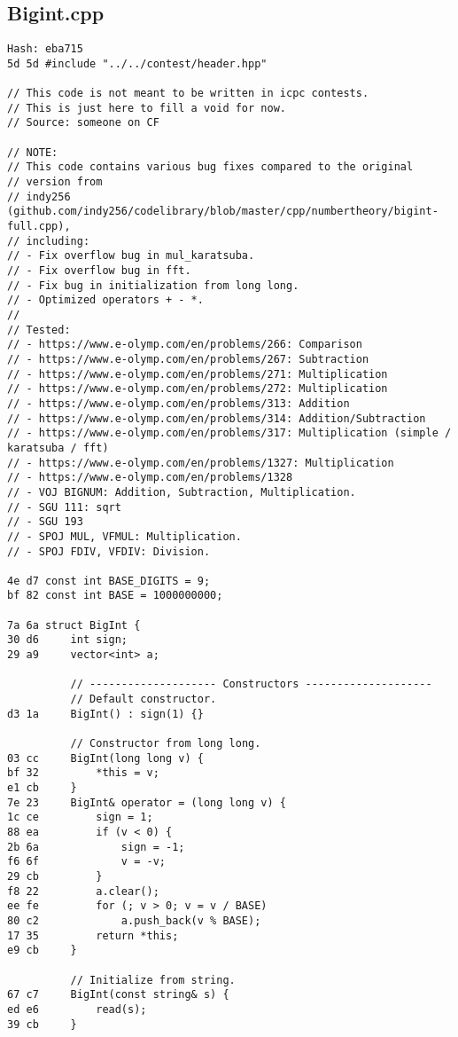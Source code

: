 \documentclass[11pt, a4paper, twoside]{article}
\begin{document}
\subsection{Bigint.cpp}
\begin{lstlisting}
Hash: eba715
5d 5d #include "../../contest/header.hpp"

// This code is not meant to be written in icpc contests. 
// This is just here to fill a void for now. 
// Source: someone on CF

// NOTE:
// This code contains various bug fixes compared to the original 
// version from
// indy256 (github.com/indy256/codelibrary/blob/master/cpp/numbertheory/bigint-full.cpp),
// including:
// - Fix overflow bug in mul_karatsuba.
// - Fix overflow bug in fft.
// - Fix bug in initialization from long long.
// - Optimized operators + - *.
//
// Tested:
// - https://www.e-olymp.com/en/problems/266: Comparison
// - https://www.e-olymp.com/en/problems/267: Subtraction
// - https://www.e-olymp.com/en/problems/271: Multiplication
// - https://www.e-olymp.com/en/problems/272: Multiplication
// - https://www.e-olymp.com/en/problems/313: Addition
// - https://www.e-olymp.com/en/problems/314: Addition/Subtraction
// - https://www.e-olymp.com/en/problems/317: Multiplication (simple / karatsuba / fft)
// - https://www.e-olymp.com/en/problems/1327: Multiplication
// - https://www.e-olymp.com/en/problems/1328
// - VOJ BIGNUM: Addition, Subtraction, Multiplication.
// - SGU 111: sqrt
// - SGU 193
// - SPOJ MUL, VFMUL: Multiplication.
// - SPOJ FDIV, VFDIV: Division.

4e d7 const int BASE_DIGITS = 9;
bf 82 const int BASE = 1000000000;

7a 6a struct BigInt {
30 d6     int sign;
29 a9     vector<int> a;
      
          // -------------------- Constructors -------------------- 
          // Default constructor.
d3 1a     BigInt() : sign(1) {}
      
          // Constructor from long long.
03 cc     BigInt(long long v) {
bf 32         *this = v;
e1 cb     }
7e 23     BigInt& operator = (long long v) {
1c ce         sign = 1;
88 ea         if (v < 0) {
2b 6a             sign = -1;
f6 6f             v = -v;
29 cb         }
f8 22         a.clear();
ee fe         for (; v > 0; v = v / BASE)
80 c2             a.push_back(v % BASE);
17 35         return *this;
e9 cb     }
      
          // Initialize from string.
67 c7     BigInt(const string& s) {
ed e6         read(s);
39 cb     }
      

\end{lstlisting}
\end{document}
